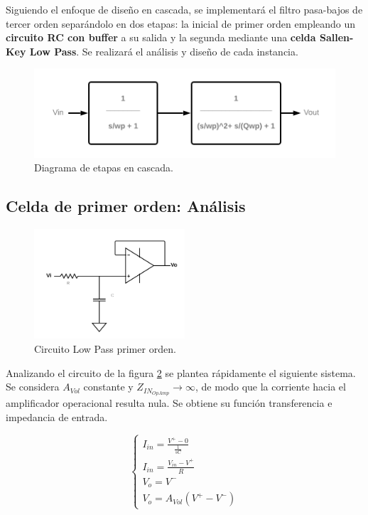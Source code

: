 Siguiendo el enfoque de diseño en cascada, se implementará el filtro pasa-bajos de tercer orden separándolo en dos etapas: la inicial de primer orden empleando un \textbf{circuito RC con buffer} a su salida y la segunda mediante una \textbf{celda Sallen-Key Low Pass}. Se realizará el análisis y diseño de cada instancia. 

\begin{figure}[H]
    \centering
    \includegraphics[scale = 0.4]{../Ejercicio2-DisenoDeCeldas/1CeldaSallenKey/images/Etapas.png}
    \caption{Diagrama de etapas en cascada.}
    \label{fig:etapas}
\end{figure}


\subsection{Celda de primer orden: Análisis}

\begin{figure}[H]
    \centering
    \includegraphics[width= 0.5\textwidth]{../Ejercicio2-DisenoDeCeldas/1CeldaSallenKey/images/LowPassRC.png}
    \caption{Circuito Low Pass primer orden.}
    \label{fig:1LPGain}
\end{figure}

Analizando el circuito de la figura \ref{fig:1LPGain} se plantea rápidamente el siguiente sistema. Se considera $A_{Vol}$ constante y $Z_{IN_{OpAmp}}\rightarrow \infty$, de modo que la corriente hacia el amplificador operacional resulta nula. Se obtiene su función transferencia e impedancia de entrada.

\begin{equation}
\left\{\begin{matrix}
        I_{in} = \frac{V^{+}-0}{\frac{1}{sC}}
        \\
        I_{in} = \frac{V_{in} - V^{+} }{R}
        \\
        V_{o} = V^{-}
        \\
        V_{o}=A_{Vol} (V^{+} - V^{-})
\end{matrix}\right.
    \label{eq:SK5}
\end{equation}


